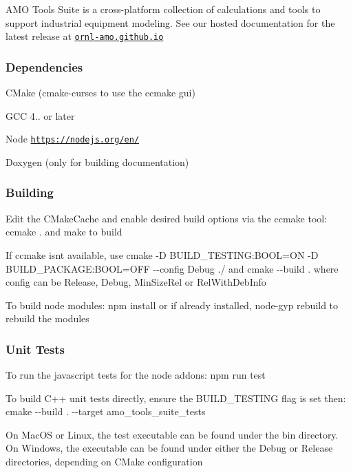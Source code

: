A\+MO Tools Suite is a cross-\/platform collection of calculations and tools to support industrial equipment modeling. See our hosted documentation for the latest release at \href{https://ornl-amo.github.io/}{\tt ornl-\/amo.\+github.\+io}

\subsubsection*{Dependencies}


\begin{DoxyItemize}
\item C\+Make (cmake-\/curses to use the ccmake gui)
\item G\+CC 4.. or later
\item Node \href{https://nodejs.org/en/}{\tt https\+://nodejs.\+org/en/}
\item Doxygen (only for building documentation)
\end{DoxyItemize}

\subsubsection*{Building}


\begin{DoxyItemize}
\item Edit the C\+Make\+Cache and enable desired build options via the ccmake tool\+: {\ttfamily ccmake .} and {\ttfamily make} to build
\item If ccmake isn\textquotesingle{}t available, use {\ttfamily cmake -\/D B\+U\+I\+L\+D\+\_\+\+T\+E\+S\+T\+I\+NG\+:B\+O\+OL=ON -\/D B\+U\+I\+L\+D\+\_\+\+P\+A\+C\+K\+A\+GE\+:B\+O\+OL=O\+FF -\/-\/config Debug ./} and {\ttfamily cmake -\/-\/build .} where config can be {\ttfamily Release}, {\ttfamily Debug}, {\ttfamily Min\+Size\+Rel} or {\ttfamily Rel\+With\+Deb\+Info}
\item To build node modules\+: {\ttfamily npm install} or if already installed, {\ttfamily node-\/gyp rebuild} to rebuild the modules
\end{DoxyItemize}

\subsubsection*{Unit Tests}


\begin{DoxyItemize}
\item To run the javascript tests for the node addons\+: {\ttfamily npm run test}
\item To build C++ unit tests directly, ensure the {\ttfamily B\+U\+I\+L\+D\+\_\+\+T\+E\+S\+T\+I\+NG} flag is set then\+: {\ttfamily cmake -\/-\/build . -\/-\/target amo\+\_\+tools\+\_\+suite\+\_\+tests}
\item On Mac\+OS or Linux, the test executable can be found under the {\ttfamily bin} directory. On Windows, the executable can be found under either the {\ttfamily Debug} or {\ttfamily Release} directories, depending on C\+Make configuration
\end{DoxyItemize}

